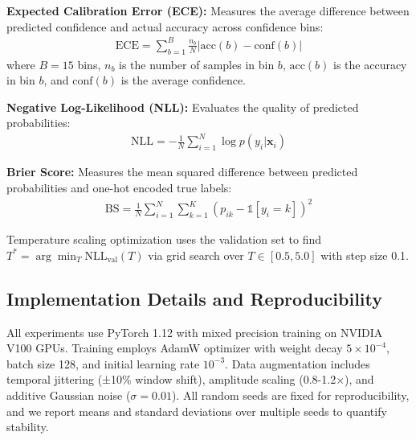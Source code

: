 \documentclass[journal]{IEEEtran}
\begin{document}
\textbf{Expected Calibration Error (ECE):} Measures the average difference between predicted confidence and actual accuracy across confidence bins:
\begin{align}
\text{ECE} = \sum_{b=1}^{B} \frac{n_b}{N} |\text{acc}(b) - \text{conf}(b)|
\end{align}
where $B=15$ bins, $n_b$ is the number of samples in bin $b$, $\text{acc}(b)$ is the accuracy in bin $b$, and $\text{conf}(b)$ is the average confidence.

\textbf{Negative Log-Likelihood (NLL):} Evaluates the quality of predicted probabilities:
\begin{align}
\text{NLL} = -\frac{1}{N} \sum_{i=1}^{N} \log p(y_i | \mathbf{x}_i)
\end{align}

\textbf{Brier Score:} Measures the mean squared difference between predicted probabilities and one-hot encoded true labels:
\begin{align}
\text{BS} = \frac{1}{N} \sum_{i=1}^{N} \sum_{k=1}^{K} (p_{ik} - \mathbb{1}[y_i = k])^2
\end{align}

Temperature scaling optimization uses the validation set to find $T^* = \arg\min_T \text{NLL}_{\text{val}}(T)$ via grid search over $T \in [0.5, 5.0]$ with step size 0.1.

\subsection{Implementation Details and Reproducibility}

All experiments use PyTorch 1.12 with mixed precision training on NVIDIA V100 GPUs. Training employs AdamW optimizer with weight decay $5 \times 10^{-4}$, batch size 128, and initial learning rate $10^{-3}$. Data augmentation includes temporal jittering (±10\% window shift), amplitude scaling (0.8-1.2×), and additive Gaussian noise ($\sigma=0.01$). All random seeds are fixed for reproducibility, and we report means and standard deviations over multiple seeds to quantify stability.
\end{document}
